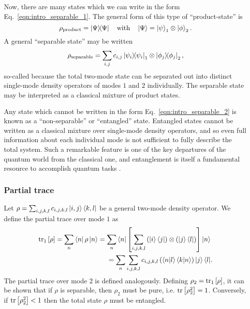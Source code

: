 Now, there are many states which we can write in the form Eq.~\ref{eqn:intro_separable_1}. The general form of this type of ``product-state'' is
\begin{equation}
\rho_{\text{product}} = \dyad{\Psi} \qq{with} \ket{\Psi} = \ket{\psi}_1 \otimes \ket{\phi}_2.
\end{equation}
A general ``separable state'' may be written
\begin{equation}\label{eqn:intro_separable_2}
\rho_{\text{separable}} = \sum_{i, j} c_{i, j} \dyad{\psi_i}_1 \otimes \dyad{\phi_j}_2,
\end{equation}
so-called because the total two-mode state can be separated out into distinct single-mode density operators of modes $1$ and $2$ individually. The separable state may be interpreted as a classical mixture of product states.

Any state which cannot be written in the form Eq.~\ref{eqn:intro_separable_2} is known as a ``non-separable'' or ``entangled'' state. Entangled states cannot be written as a classical mixture over single-mode density operators, and so even full information about each individual mode is not sufficient to fully describe the total system. Such a remarkable feature is one of the key departures of the quantum world from the classical one, and entanglement is itself a fundamental resource to accomplish quantum tasks \cite{Horodecki2009b, Eisert2003}.

\subsubsection{Partial trace}
Let $\rho = \sum_{i, j, k, l} c_{i, j, k, l} \ket{i, j}\bra{k, l}$ be a general two-mode density operator. We define the partial trace over mode $1$ as
\begin{align*}
\tr_1\left[\rho\right] = \sum_n \bra{n}\rho\ket{n} = \sum_n \bra{n} \left[\sum_{i, j, k, l} \left(\ket{i}\bra{j}\right) \otimes \left(\ket{j}\bra{l}\right) \right] \ket{n}& \\
= \sum_n \sum_{i, j, k, l} c_{i, j, k, l} \left(\ip{n}{l} \ip{k}{n} \right) \ket{j}\bra{l}&.
\end{align*}
The partial trace over mode $2$ is defined analogously. Defining $\rho_2 = \tr_1\left[\rho\right]$, it can be shown that if $\rho$ is separable, then $\rho_2$ must be pure, i.e. $\tr\left[\rho_2^2\right]=1$. Conversely, if $\tr\left[\rho_2^2\right] < 1$ then the total state $\rho$ must be entangled.







